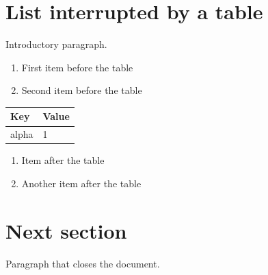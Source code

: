 \documentclass[11pt,a4paper]{article}
\begin{document}
\section{List interrupted by a table}

Introductory paragraph.

\begin{enumerate}
\item First item before the table
\item Second item before the table
\end{enumerate}

\begin{table}[h]
\begin{tabular}{|l|l|}
\hline
Key & Value \\ \hline
alpha & 1 \\ \hline
\end{tabular}
\end{table}

\begin{enumerate}
\item Item after the table
\item Another item after the table
\end{enumerate}

\section{Next section}

Paragraph that closes the document.
\end{document}
